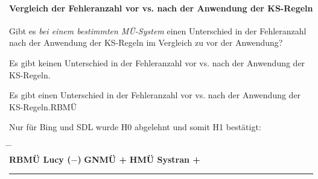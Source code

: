 \paragraph*{Vergleich der Fehleranzahl vor vs. nach der Anwendung der KS-Regeln}
\begin{description}[font=\normalfont\bfseries]
\item [Fragestellung:] Gibt es \textit{bei einem bestimmten MÜ-System} einen Unterschied in der Fehleranzahl nach der Anwendung der KS-Regeln im Vergleich zu vor der Anwendung?
\item [H0 --] Es gibt keinen Unterschied in der Fehleranzahl vor vs. nach der Anwendung der KS-Regeln.
\item [H1 --] Es gibt einen Unterschied in der Fehleranzahl vor vs. nach der Anwendung der KS-Regeln.RBMÜ
\item [Resultat:] Nur für Bing und SDL wurde H0 abgelehnt und somit H1 bestätigt: \\
\begin{tabbing}
\hspace{1cm}\= \hspace{1cm} \= \hspace{4cm} \\
\textbf{RBMÜ Lucy ($-$)}\> \textbf{GNMÜ +}\> \textbf{HMÜ Systran +}
\end{tabbing}
\end{description}

\hrule
